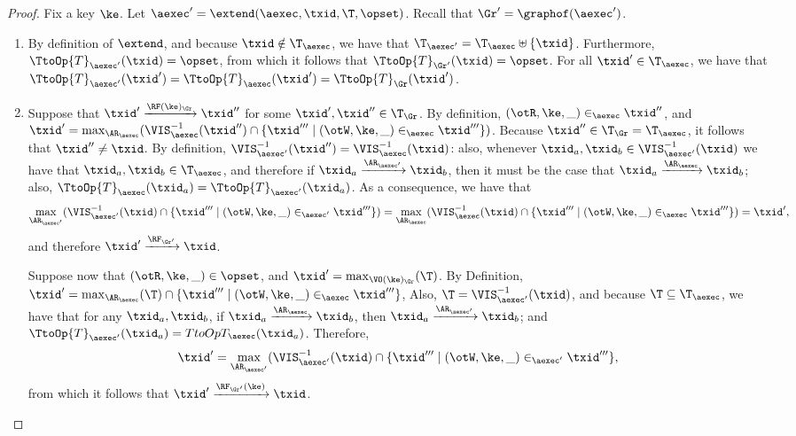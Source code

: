\begin{proof}
Fix a key $\ke$. Let $\aexec' = \extend(\aexec, \txid, \T, \opset)$. Recall that $\Gr' = \graphof(\aexec')$.

\begin{enumerate}
\item By definition of $\extend$, and 
because $\txid \notin \T_{\aexec}$, we have that 
$\T_{\aexec'} = \T_{\aexec} \uplus \{\txid\}$. Furthermore, $\TtoOp{T}_{\aexec'}(\txid) = \opset$, 
from which it follows that $\TtoOp{T}_{\Gr'}(\txid) = \opset$.
For all $\txid' \in \T_{\aexec}$, we have that $\TtoOp{T}_{\aexec'}(\txid') = 
\TtoOp{T}_{\aexec}(\txid') = \TtoOp{T}_{\Gr}(\txid')$.
\item
Suppose that $\txid' \xrightarrow{\RF(\ke)_{\Gr}} \txid''$ for some $\txid', \txid'' \in \T_{\Gr}$. 
By definition, $(\otR, \ke, \_) \in_{\aexec} \txid''$,  
and $\txid' = \max_{\AR_{\aexec}}(\VIS_{\aexec}^{-1}(\txid'') \cap \{\txid''' \mid (\otW, \ke, \_) \in_{\aexec} \txid'''\})$. 
Because $\txid'' \in \T_{\Gr} = \T_{\aexec}$, it follows that $\txid'' \neq \txid$. By definition, 
$\VIS^{-1}_{\aexec'}(\txid'') = \VIS^{-1}_{\aexec}(\txid)$: also, whenever 
$\txid_{a}, \txid_{b} \in \VIS^{-1}_{\aexec'}(\txid)$ we have that $\txid_{a}, \txid_{b} \in \T_{\aexec}$, 
and therefore if $\txid_{a} \xrightarrow{\AR_{\aexec'}} \txid_{b}$, then it must be the case 
that $\txid_{a} \xrightarrow{\AR_{\aexec}} \txid_b$; also, $\TtoOp{T}_{\aexec}(\txid_{a}) = \TtoOp{T}_{\aexec'}(\txid_{a})$. 
As a consequence, we have that 
\[\max_{\AR_{\aexec'}}(\VIS^{-1}_{\aexec'}(\txid) \cap \{ \txid''' \mid (\otW, \ke, \_) \in_{\aexec'} \txid'''\}) = 
\max_{\AR_{\aexec}}(\VIS^{-1}_{\aexec}(\txid) \cap \{ \txid''' \mid (\otW, \ke, \_) \in_{\aexec} \txid'''\}) = \txid', \] 
and therefore $\txid' \xrightarrow{\RF_{\Gr'}} \txid$. 

Suppose now that $(\otR,\ke, \_) \in \opset$, and $\txid' = \max_{\VO(\ke)_{\Gr}}(\T)$. 
By Definition, $\txid' = \max_{\AR_{\aexec}}(\T) \cap \{ \txid''' \mid (\otW, \ke, \_) \in_{\aexec} \txid'''\}$, 
Also, $\T = \VIS^{-1}_{\aexec'}(\txid)$, and because $\T \subseteq \T_{\aexec}$, we have 
that for any $\txid_{a}, \txid_{b}$, if $\txid_{a} \xrightarrow{\AR_{\aexec}} \txid_{b}$, 
then $\txid_{a} \xrightarrow{\AR_{\aexec'}} \txid_{b}$; and $\TtoOp{T}_{\aexec'}(\txid_{a}) = 
TtoOp{T}_{\aexec}(\txid_a)$. Therefore, 
\[
\txid' = \max_{\AR_{\aexec'}}(\VIS^{-1}_{\aexec'}(\txid) \cap \{ \txid''' \mid (\otW, \ke, \_) \in_{\aexec'} \txid'''\}, 
\] 
from which it follows that $\txid' \xrightarrow{\RF_{\Gr'}(\ke)}\txid$.


\end{enumerate}
\end{proof}
